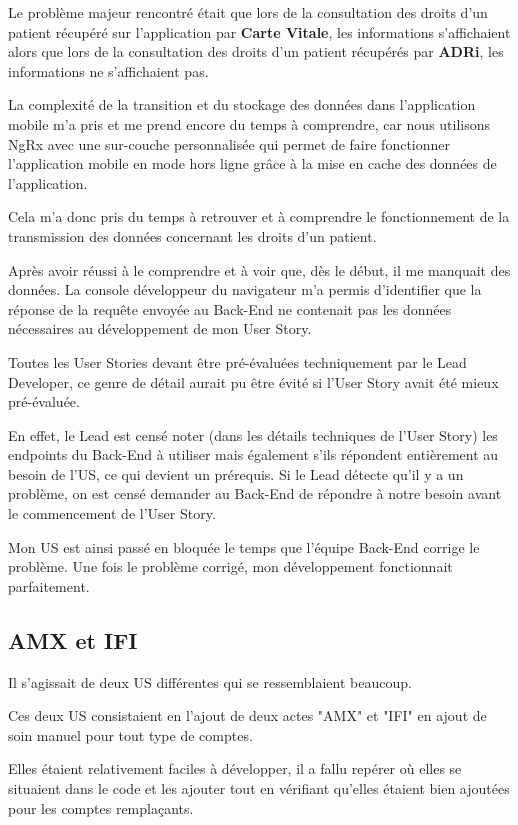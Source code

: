 \documentclass{article}
\begin{document}
Le problème majeur rencontré était que lors de la consultation des droits d'un patient récupéré sur l'application par \textbf{Carte Vitale}, les informations s'affichaient alors que lors de la consultation des droits d'un patient récupérés par \textbf{ADRi}, les informations ne s'affichaient pas.

La complexité de la transition et du stockage des données dans l'application mobile m'a pris et me prend encore du temps à comprendre, car nous utilisons NgRx avec une sur-couche personnalisée qui permet de faire fonctionner l'application mobile en mode hors ligne grâce à la mise en cache des données de l'application.

Cela m'a donc pris du temps à retrouver et à comprendre le fonctionnement de la transmission des données concernant les droits d'un patient.

Après avoir réussi à le comprendre et à voir que, dès le début, il me manquait des données. La console développeur du navigateur m'a permis d'identifier que la réponse de la requête envoyée au Back-End ne contenait pas les données nécessaires au développement de mon User Story.

Toutes les User Stories devant être pré-évaluées techniquement par le Lead Developer, ce genre de détail aurait pu être évité si l'User Story avait été mieux pré-évaluée.

En effet, le Lead est censé noter (dans les détails techniques de l'User Story) les endpoints du Back-End à utiliser mais également s'ils répondent entièrement au besoin de l'US, ce qui devient un prérequis. Si le Lead détecte qu'il y a un problème, on est censé demander au Back-End de répondre à notre besoin avant le commencement de l'User Story.

Mon US est ainsi passé en bloquée le temps que l'équipe Back-End corrige le problème.
Une fois le problème corrigé, mon développement fonctionnait parfaitement.

\subsection{AMX et IFI}

Il s'agissait de deux US différentes qui se ressemblaient beaucoup.

Ces deux US consistaient en l'ajout de deux actes "AMX" et "IFI" en ajout de soin manuel pour tout type de comptes.

Elles étaient relativement faciles à développer, il a fallu repérer où elles se situaient dans le code et les ajouter tout en vérifiant qu'elles étaient bien ajoutées pour les comptes remplaçants.
\end{document}
